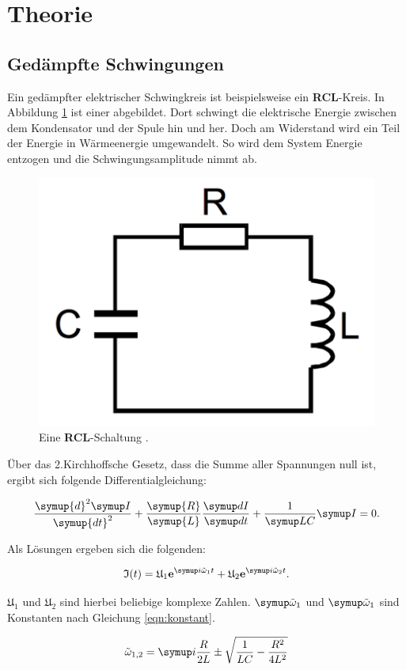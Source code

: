 \section{Theorie}
\label{sec:Theorie}

\subsection{Gedämpfte Schwingungen}

Ein gedämpfter elektrischer Schwingkreis ist beispielsweise ein \textbf{RCL}-Kreis.
In Abbildung \ref{fig:rcl} ist einer abgebildet.
Dort schwingt die elektrische Energie zwischen dem Kondensator und der Spule
hin und her. Doch am Widerstand wird ein Teil der Energie in Wärmeenergie umgewandelt.
So wird dem System Energie entzogen und die Schwingungsamplitude nimmt ab.

\begin{figure}[h]
  \centering
  \includegraphics[height = 3 cm]{RCL.pdf}
  \caption{Eine \textbf{RCL}-Schaltung \cite{anleitung}.}
  \label{fig:rcl}
\end{figure}

Über das 2.Kirchhoffsche Gesetz, dass die Summe aller Spannungen null ist, ergibt
sich folgende Differentialgleichung:

\begin{equation}
  \frac{\symup{d}^2 \g{I}}{\symup{d t}^2} + \frac{\symup{R}}{\symup{L}}
  \frac{\g{d I}}{\g{d t}} + \frac{1}{\g{L C}} \g{I} = 0.
  \label{eqn:dgl}
\end{equation}

Als Lösungen ergeben sich die folgenden:

\begin{equation}
  \mathfrak{I}(t) = \mathfrak{U}_1 \textbf{e}^{\g{i\tilde{\omega}_1t}} + \mathfrak{U}_2
  \textbf{e}^{\g{i\tilde{\omega}_2t}}.
\end{equation}

$\mathfrak{U}_1$ und $\mathfrak{U}_2$ sind hierbei beliebige komplexe Zahlen.
$\g{\tilde{\omega}}_\text{1}$ und $\g{\tilde{\omega}}_\text{1}$ sind Konstanten nach Gleichung
\eqref{eqn:konstant}.

\begin{equation}
  \tilde{\omega}_{1,2} = \g{i\frac{R}{2 L} \pm \sqrt{\frac{1}{L C} - \frac{R^2}{4 L^2}}}
  \label{eqn:konstant}
\end{equation}


